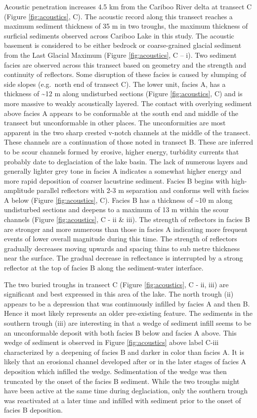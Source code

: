 \documentclass[Royal,times,doublespace,sageh]{sagej}
\begin{document}
Acoustic penetration increases 4.5 km from the Cariboo River delta at
transect C (Figure \ref{fig:acoustics}, C). The acoustic record along
this transect reaches a maximum sediment thickness of 35 m in two
troughs, the maximum thickness of surficial sediments observed across
Cariboo Lake in this study. The acoustic basement is considered to be
either bedrock or coarse-grained glacial sediment from the Last Glacial
Maximum (Figure \ref{fig:acoustics}, C -- i). Two sediment facies are
observed across this transect based on geometry and the strength and
continuity of reflectors. Some disruption of these facies is caused by
slumping of side slopes (e.g.~north end of transect C). The lower unit,
facies A, has a thickness of \textasciitilde12 m along undisturbed
sections (Figure \ref{fig:acoustics}, C) and is more massive to weakly
acoustically layered. The contact with overlying sediment above facies A
appears to be conformable at the south end and middle of the transect
but unconformable in other places. The unconformities are most apparent
in the two sharp crested v-notch channels at the middle of the transect.
These channels are a continuation of those noted in transect B. These
are inferred to be scour channels formed by erosive, higher energy,
turbidity currents that probably date to deglaciation of the lake basin.
The lack of numerous layers and generally lighter grey tone in facies A
indicates a somewhat higher energy and more rapid deposition of coarser
lacustrine sediment. Facies B begins with high-amplitude parallel
reflectors with 2-3 m separation and conforms well with facies A below
(Figure \ref{fig:acoustics}, C). Facies B has a thickness of
\textasciitilde10 m along undisturbed sections and deepens to a maximum
of 13 m within the scour channels (Figure \ref{fig:acoustics}, C - ii \&
iii). The strength of reflectors in facies B are stronger and more
numerous than those in facies A indicating more frequent events of lower
overall magnitude during this time. The strength of reflectors gradually
decreases moving upwards and spacing thins to sub metre thickness near
the surface. The gradual decrease in reflectance is interrupted by a
strong reflector at the top of facies B along the sediment-water
interface.

The two buried troughs in transect C (Figure \ref{fig:acoustics}, C -
ii, iii) are significant and best expressed in this area of the lake.
The north trough (ii) appears to be a depression that was continuously
infilled by facies A and then B. Hence it most likely represents an
older pre-existing feature. The sediments in the southern trough (iii)
are interesting in that a wedge of sediment infill seems to be an
unconformable deposit with both facies B below and facies A above. This
wedge of sediment is observed in Figure \ref{fig:acoustics} above label
C-iii characterized by a deepening of facies B and darker in color than
facies A. It is likely that an erosional channel developed after or in
the later stages of facies A deposition which infilled the wedge.
Sedimentation of the wedge was then truncated by the onset of the facies
B sediment. While the two troughs might have been active at the same
time during deglaciation, only the southern trough was reactivated at a
later time and infilled with sediment prior to the onset of facies B
deposition.
\end{document}
